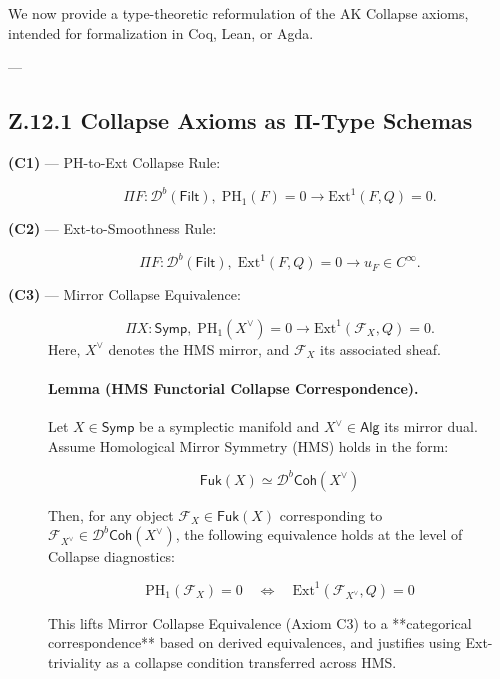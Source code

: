 \documentclass[11pt]{article}
\begin{document}
\begin{axiom}
\begin{axiom}
{{We now provide a type-theoretic reformulation of the AK Collapse axioms, intended for formalization in Coq, Lean, or Agda.

---

\subsection*{Z.12.1 Collapse Axioms as Π-Type Schemas}

\begin{description}
  \item[\textbf{(C1)} — PH-to-Ext Collapse Rule:]  
  \[
  \Pi F : \mathcal{D}^b(\mathsf{Filt}),\; \mathrm{PH}_1(F) = 0 \rightarrow \mathrm{Ext}^1(F, Q) = 0.
  \]

  \item[\textbf{(C2)} — Ext-to-Smoothness Rule:]  
  \[
  \Pi F : \mathcal{D}^b(\mathsf{Filt}),\; \mathrm{Ext}^1(F, Q) = 0 \rightarrow u_F \in C^\infty.
  \]

  \item[\textbf{(C3)} — Mirror Collapse Equivalence:]  
  \[
  \Pi X : \mathsf{Symp},\; \mathrm{PH}_1(X^\vee) = 0 \rightarrow \mathrm{Ext}^1(\mathcal{F}_{X}, Q) = 0.
  \]
  Here, \( X^\vee \) denotes the HMS mirror, and \( \mathcal{F}_{X} \) its associated sheaf.

\paragraph{Lemma (HMS Functorial Collapse Correspondence).}

Let \( X \in \mathsf{Symp} \) be a symplectic manifold and \( X^\vee \in \mathsf{Alg} \) its mirror dual.  
Assume Homological Mirror Symmetry (HMS) holds in the form:

\[
\mathsf{Fuk}(X) \simeq \mathcal{D}^b\mathsf{Coh}(X^\vee)
\]

Then, for any object \( \mathcal{F}_X \in \mathsf{Fuk}(X) \) corresponding to \( \mathcal{F}_{X^\vee} \in \mathcal{D}^b\mathsf{Coh}(X^\vee) \),  
the following equivalence holds at the level of Collapse diagnostics:

\[
\mathrm{PH}_1(\mathcal{F}_X) = 0 \quad \Leftrightarrow \quad \mathrm{Ext}^1(\mathcal{F}_{X^\vee}, Q) = 0
\]

This lifts Mirror Collapse Equivalence (Axiom C3) to a **categorical correspondence** based on derived equivalences,  
and justifies using Ext-triviality as a collapse condition transferred across HMS.

\vspace{1em}

\end{description}}}
\end{axiom}
\end{axiom}
\end{document}
